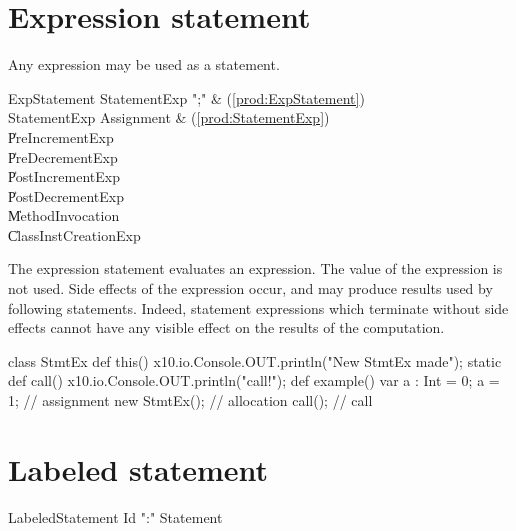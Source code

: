 \section{Expression statement}

Any expression may be used as a statement.

\begin{bbgrammar}
        ExpStatement \: StatementExp \xcd";" & (\ref{prod:ExpStatement}) \\
        StatementExp \: Assignment & (\ref{prod:StatementExp}) \\
                     \| PreIncrementExp \\
                     \| PreDecrementExp \\
                     \| PostIncrementExp \\
                     \| PostDecrementExp \\
                     \| MethodInvocation \\
                     \| ClassInstCreationExp \\
\end{bbgrammar}

The expression statement evaluates an expression. The value of the expression
is not used. Side effects of the expression occur, and may produce results
used by following statements. Indeed, statement expressions which terminate
without side effects cannot have any visible effect on the results of the
computation. 


\begin{ex}
\begin{xten}
class StmtEx {
  def this() { 
     x10.io.Console.OUT.println("New StmtEx made");  }
  static def call() { 
     x10.io.Console.OUT.println("call!");}
  def example() {
     var a : Int = 0;
     a = 1; // assignment
     new StmtEx(); // allocation
     call(); // call
  }
}
\end{xten}
%
\end{ex}



\section{Labeled statement}


\begin{bbgrammar}
    LabeledStatement \: Id \xcd":" Statement 
\end{bbgrammar}


